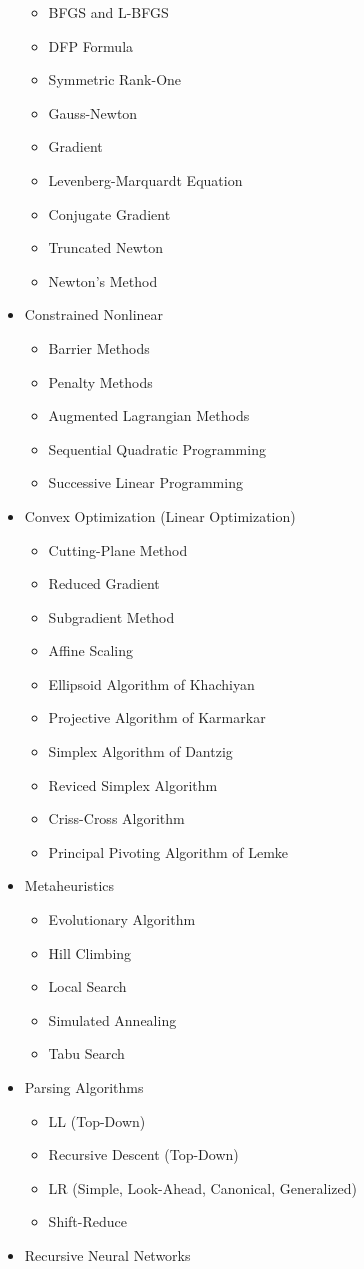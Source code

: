 \documentclass[a4paper]{article}
\begin{document}
\begin{itemize}
\begin{itemize}
  \item BFGS and L-BFGS
  \item DFP Formula
  \item Symmetric Rank-One
  \item Gauss-Newton
  \item Gradient
  \item Levenberg-Marquardt Equation
  \item Conjugate Gradient
  \item Truncated Newton
  \item Newton's Method
  \end{itemize}
\item Constrained Nonlinear
  \begin{itemize}
  \item Barrier Methods
  \item Penalty Methods
  \item Augmented Lagrangian Methods
  \item Sequential Quadratic Programming
  \item Successive Linear Programming
  \end{itemize}
\item Convex Optimization (Linear Optimization)
  \begin{itemize}
  \item Cutting-Plane Method
  \item Reduced Gradient
  \item Subgradient Method
  \item Affine Scaling
  \item Ellipsoid Algorithm of Khachiyan
  \item Projective Algorithm of Karmarkar
  \item Simplex Algorithm of Dantzig
  \item Reviced Simplex Algorithm
  \item Criss-Cross Algorithm
  \item Principal Pivoting Algorithm of Lemke
  \end{itemize}
\item Metaheuristics
  \begin{itemize}
  \item Evolutionary Algorithm
  \item Hill Climbing
  \item Local Search
  \item Simulated Annealing
  \item Tabu Search
  \end{itemize}
\item Parsing Algorithms
  \begin{itemize}
  \item LL (Top-Down)
  \item Recursive Descent (Top-Down)
  \item LR (Simple, Look-Ahead, Canonical, Generalized)
  \item Shift-Reduce
  \end{itemize}
\item Recursive Neural Networks
\end{itemize}
\end{document}
